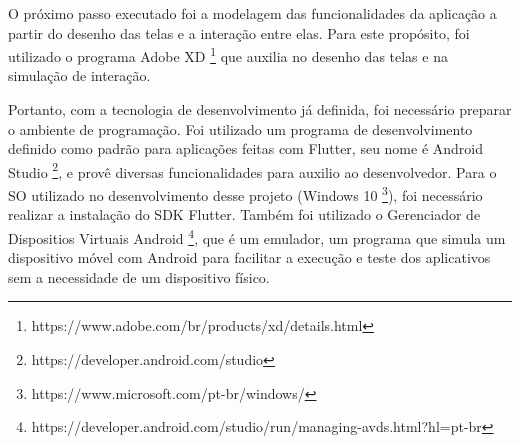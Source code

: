 O próximo passo executado foi a modelagem das funcionalidades da aplicação a partir do desenho das telas e a interação entre elas. Para este propósito, foi utilizado o programa Adobe XD \footnote{https://www.adobe.com/br/products/xd/details.html} que auxilia no desenho das telas e na simulação de interação.

Portanto, com a tecnologia de desenvolvimento já definida, foi necessário preparar o ambiente de programação. Foi utilizado um programa de desenvolvimento definido como padrão para aplicações feitas com Flutter, seu nome é Android Studio \footnote{https://developer.android.com/studio}, e provê diversas funcionalidades para auxilio ao desenvolvedor. Para o SO utilizado no desenvolvimento desse projeto (Windows 10 \footnote{https://www.microsoft.com/pt-br/windows/}), foi necessário realizar a instalação do SDK Flutter. Também foi utilizado o Gerenciador de Dispositios Virtuais Android \footnote{https://developer.android.com/studio/run/managing-avds.html?hl=pt-br}, que é um emulador, um programa que simula um dispositivo móvel com Android para facilitar a execução e teste dos aplicativos sem a necessidade de um dispositivo físico.





